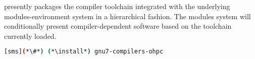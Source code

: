 \OHPC{} presently packages the \GNU{} compiler toolchain integrated with the 
underlying modules-environment system in a hierarchical fashion. The modules
system will conditionally present compiler-dependent software based on the
toolchain currently loaded. 

\begin{lstlisting}[language=bash]
[sms](*\#*) (*\install*) gnu7-compilers-ohpc
\end{lstlisting}
